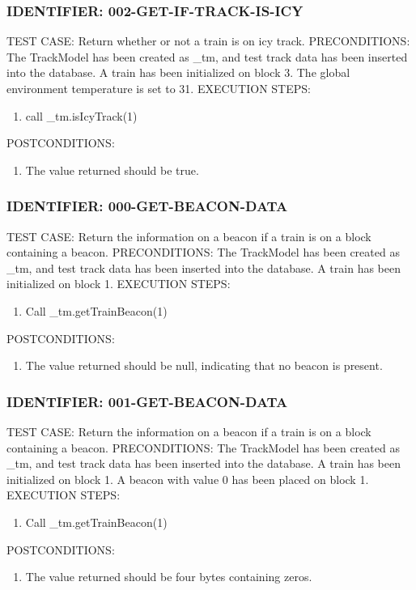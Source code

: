 \documentclass{scrreprt}
\begin{document}
\subsubsection{IDENTIFIER: 002-GET-IF-TRACK-IS-ICY}
TEST CASE: Return whether or not a train is on icy track.
PRECONDITIONS: The TrackModel has been created as _tm, and test track data has been inserted into the database. A train has been initialized on block 3. The global environment temperature is set to 31.
EXECUTION STEPS:
\begin{enumerate}
	\item call _tm.isIcyTrack(1)
\end{enumerate}
POSTCONDITIONS:
\begin{enumerate}
	\item The value returned should be true.
\end{enumerate}

\subsubsection{IDENTIFIER: 000-GET-BEACON-DATA}
TEST CASE: Return the information on a beacon if a train is on a block containing a beacon.
PRECONDITIONS: The TrackModel has been created as _tm, and test track data has been inserted into the database. A train has been initialized on block 1.
EXECUTION STEPS:
\begin{enumerate}
	\item Call _tm.getTrainBeacon(1)
\end{enumerate}
POSTCONDITIONS:
\begin{enumerate}
	\item The value returned should be null, indicating that no beacon is present.
\end{enumerate}

\subsubsection{IDENTIFIER: 001-GET-BEACON-DATA}
TEST CASE: Return the information on a beacon if a train is on a block containing a beacon.
PRECONDITIONS: The TrackModel has been created as _tm, and test track data has been inserted into the database. A train has been initialized on block 1. A beacon with value 0 has been placed on block 1.
EXECUTION STEPS:
\begin{enumerate}
	\item Call _tm.getTrainBeacon(1)
\end{enumerate}
POSTCONDITIONS:
\begin{enumerate}
	\item The value returned should be four bytes containing zeros.
\end{enumerate}
\end{document}
